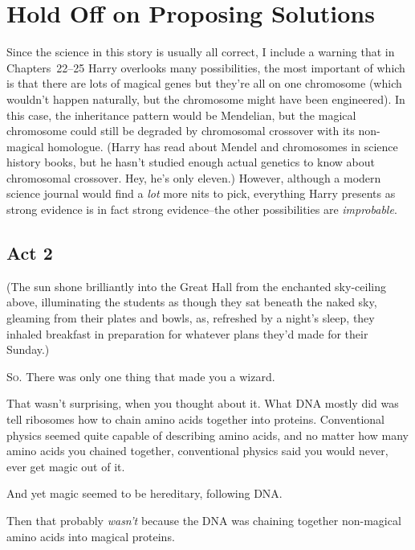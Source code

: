 \chapter{Hold Off on Proposing Solutions}

\begin{chapterOpeningAuthorNote}
Since the science in this story is usually all correct, I include a warning that in Chapters~22--25 Harry overlooks many possibilities, the most important of which is that there are lots of magical genes but they're all on one chromosome (which wouldn't happen naturally, but the chromosome might have been engineered). In this case, the inheritance pattern would be Mendelian, but the magical chromosome could still be degraded by chromosomal crossover with its non-magical homologue. (Harry has read about Mendel and chromosomes in science history books, but he hasn't studied enough actual genetics to know about chromosomal crossover. Hey, he's only eleven.) However, although a modern science journal would find a \emph{lot} more nits to pick, everything Harry presents as strong evidence is in fact strong evidence\---the other possibilities are \emph{improbable}.
\end{chapterOpeningAuthorNote}

\section{Act 2}

(The sun shone brilliantly into the Great Hall from the enchanted sky-ceiling above, illuminating the students as though they sat beneath the naked sky, gleaming from their plates and bowls, as, refreshed by a night's sleep, they inhaled breakfast in preparation for whatever plans they'd made for their Sunday.)

\lettrine{S}{o.} There was only one thing that made you a wizard.

That wasn't surprising, when you thought about it. What DNA mostly did was tell ribosomes how to chain amino acids together into proteins. Conventional physics seemed quite capable of describing amino acids, and no matter how many amino acids you chained together, conventional physics said you would never, ever get magic out of it.

And yet magic seemed to be hereditary, following DNA.

Then that probably \emph{wasn't} because the DNA was chaining together non-magical amino acids into magical proteins.

